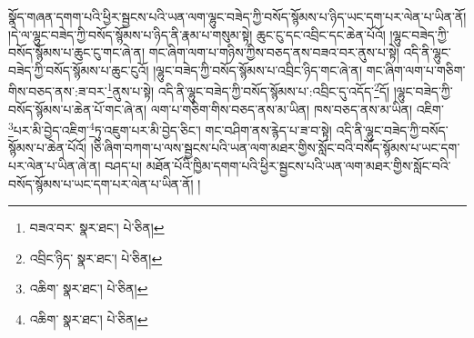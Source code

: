 སྣོད་གཞན་དགག་པའི་ཕྱིར་སྦྱངས་པའི་ཡན་ལག་ལྷུང་བཟེད་ཀྱི་བསོད་སྙོམས་པ་ཉིད་ཡང་དག་པར་ལེན་པ་ཡིན་ནོ། །དེ་ལ་ལྷུང་བཟེད་ཀྱི་བསོད་སྙོམས་པ་ཉིད་ནི་རྣམ་པ་གསུམ་སྟེ། ཆུང་ངུ་དང་འབྲིང་དང་ཆེན་པོའོ། །ལྷུང་བཟེད་ཀྱི་བསོད་སྙོམས་པ་ཆུང་ངུ་གང་ཞེ་ན། གང་ཞིག་ལག་པ་གཉིས་ཀྱིས་བཅད་ནས་བཟའ་བར་ནུས་པ་སྟེ། འདི་ནི་ལྷུང་བཟེད་ཀྱི་བསོད་སྙོམས་པ་ཆུང་ངུའོ། །ལྷུང་བཟེད་ཀྱི་བསོད་སྙོམས་པ་འབྲིང་ཉིད་གང་ཞེ་ན། གང་ཞིག་ལག་པ་གཅིག་གིས་བཅད་ནས་:ཟ་བར་\footnote{བཟའ་བར་  སྣར་ཐང་།  པེ་ཅིན། }ནུས་པ་སྟེ། འདི་ནི་ལྷུང་བཟེད་ཀྱི་བསོད་སྙོམས་པ་:འབྲིང་དུ་འདོད་\footnote{འབྲིང་ཉིད་  སྣར་ཐང་།  པེ་ཅིན། }དོ། །ལྷུང་བཟེད་ཀྱི་བསོད་སྙོམས་པ་ཆེན་པོ་གང་ཞེ་ན། ལག་པ་གཅིག་གིས་བཅད་ནས་མ་ཡིན། ཁས་བཅད་ནས་མ་ཡིན། འཇིག་\footnote{འཆིག་  སྣར་ཐང་།  པེ་ཅིན། }པར་མི་བྱེད་འཇིག་\footnote{འཆིག་  སྣར་ཐང་།  པེ་ཅིན། }ཏུ་འཇུག་པར་མི་བྱེད་ཅིང་། གང་བཤིག་ནས་རྙེད་པ་ཟ་བ་སྟེ། འདི་ནི་ལྷུང་བཟེད་ཀྱི་བསོད་སྙོམས་པ་ཆེན་པོའོ། །ཅི་ཞིག་བཀག་པ་ལས་སྦྱངས་པའི་ཡན་ལག་མཐར་གྱིས་སློང་བའི་བསོད་སྙོམས་པ་ཡང་དག་པར་ལེན་པ་ཡིན་ཞེ་ན། བཤད་པ། མཐོན་པོའི་ཁྱིམ་དགག་པའི་ཕྱིར་སྦྱངས་པའི་ཡན་ལག་མཐར་གྱིས་སློང་བའི་བསོད་སྙོམས་པ་ཡང་དག་པར་ལེན་པ་ཡིན་ནོ། །
